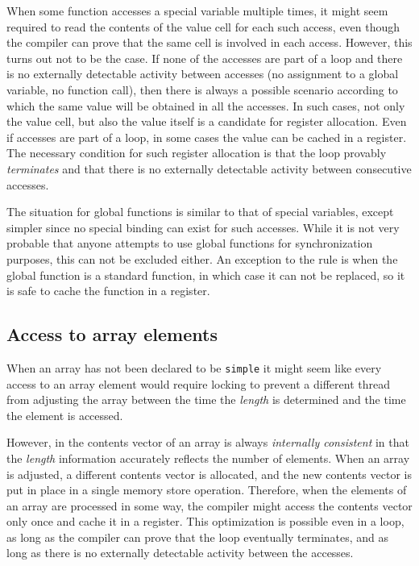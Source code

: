 When some function accesses a special variable multiple times, it
might seem required to read the contents of the value cell for each
such access, even though the compiler can prove that the same cell is
involved in each access.  However, this turns out not to be the case.
If none of the accesses are part of a loop and there is no externally
detectable activity between accesses (no assignment to a global
variable, no function call), then there is always a possible scenario
according to which the same value will be obtained in all the
accesses.  In such cases, not only the value cell, but also the value
itself is a candidate for register allocation.  Even if accesses are
part of a loop, in some cases the value can be cached in a register.
The necessary condition for such register allocation is that the loop
provably \emph{terminates} and that there is no externally detectable
activity between consecutive accesses. 

The situation for global functions is similar to that of special
variables, except simpler since no special binding can exist for such
accesses.  While it is not very probable that anyone attempts to use
global functions for synchronization purposes, this can not be
excluded either.  An exception to the rule is when the global function
is a standard \cl{} function, in which case it can not be replaced, so
it is safe to cache the function in a register. 

\subsection{Access to array elements}

When an array has not been declared to be \texttt{simple} it might
seem like every access to an array element would require locking to
prevent a different thread from adjusting the array between the time
the \emph{length} is determined and the time the element is accessed.

However, in \sysname{} the contents vector of an array is always
\emph{internally consistent} in that the \emph{length} information
accurately reflects the number of elements.  When an array is
adjusted, a different contents vector is allocated, and the new
contents vector is put in place in a single memory store operation.
Therefore, when the elements of an array are processed in some way,
the compiler might access the contents vector only once and cache it
in a register.  This optimization is possible even in a loop, as long
as the compiler can prove that the loop eventually terminates, and as
long as there is no externally detectable activity between the
accesses. 

